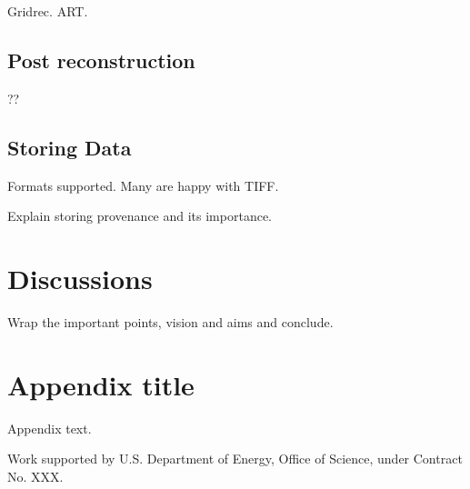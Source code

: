\documentclass[pdf]{iucr}              %
\begin{document}
Gridrec. ART. 

\subsection{Post reconstruction}

??

\subsection{Storing Data}

Formats supported. Many are happy with TIFF. 

Explain storing provenance and its importance.

\section{Discussions}

Wrap the important points, vision and aims and conclude.

\appendix
\section{Appendix title}

Appendix text.



Work supported by U.S. Department of Energy, Office of Science, under Contract No. XXX.




 
\end{document}
